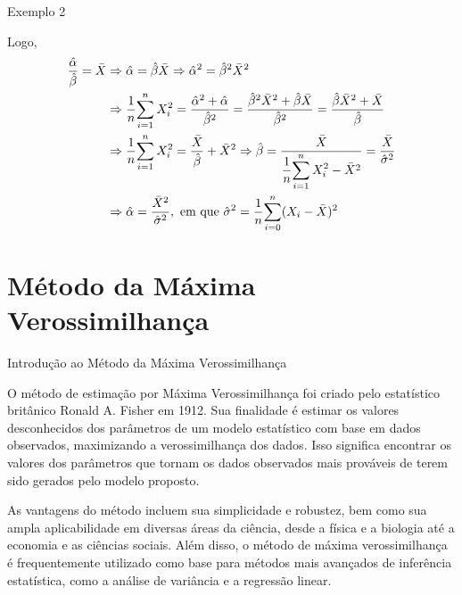 \documentclass[12pt]{beamer}
\begin{document}
\begin{frame}{Exemplo 2}
\begin{block}{}
\justifying
Logo,
\begin{align*}
\dfrac{\hat{\alpha}}{\hat{\beta}}=\bar{X}&\Rightarrow \hat{\alpha}=\hat{\beta}\bar{X}\Rightarrow \hat{\alpha}^{2}=\hat{\beta}^{2}\bar{X}^{2}\\ &\Rightarrow \dfrac{1}{n}{\displaystyle \sum_{i=1}^{n}X_{i}^{2}}=\dfrac{\hat{\alpha}^{2}+\hat{\alpha}}{\hat{\beta}^{2}}=\dfrac{\hat{\beta}^{2}\bar{X}^{2}+\hat{\beta}\bar{X}}{\hat{\beta}^{2}}=\dfrac{\hat{\beta}\bar{X}^{2}+\bar{X}}{\hat{\beta}}\\
&\Rightarrow \dfrac{1}{n}{\displaystyle \sum_{i=1}^{n}X_{i}^{2}}=\dfrac{\bar{X}}{\hat{\beta}}+\bar{X}^{2}\Rightarrow \hat{\beta}=\dfrac{\Bar{X}}{\dfrac{1}{n}{\displaystyle \sum_{i=1}^{n}X_{i}^{2}}-\Bar{X}^{2}}=\dfrac{\bar{X}}{\hat{\sigma}^{2}}\\
&\Rightarrow \hat{\alpha}=\dfrac{\bar{X}^{2}}{\hat{\sigma}^{2}},~\text{em que}~\hat{\sigma}^{2}=\dfrac{1}{n}{\displaystyle \sum_{i=0}^{n}(X_{i}-\bar{X})^{2}}
\end{align*}
\end{block}
\end{frame}

\section{Método da Máxima Verossimilhança}
\begin{frame}{Introdução ao Método da Máxima Verossimilhança}
    \begin{block}{}
    \justifying
O método de estimação por Máxima Verossimilhança foi criado pelo estatístico britânico Ronald A. Fisher em 1912. Sua finalidade é estimar os valores desconhecidos dos parâmetros de um modelo estatístico com base em dados observados, maximizando a verossimilhança dos dados. Isso significa encontrar os valores dos parâmetros que tornam os dados observados mais prováveis de terem sido gerados pelo modelo proposto. 
\end{block}
\end{frame}

\begin{frame}{}
    \begin{block}{}
    \justifying
As vantagens do método incluem sua simplicidade e robustez, bem como sua ampla aplicabilidade em diversas áreas da ciência, desde a física e a biologia até a economia e as ciências sociais. Além disso, o método de máxima verossimilhança é frequentemente utilizado como base para métodos mais avançados de inferência estatística, como a análise de variância e a regressão linear.
\end{block}
\end{frame}
\end{document}
